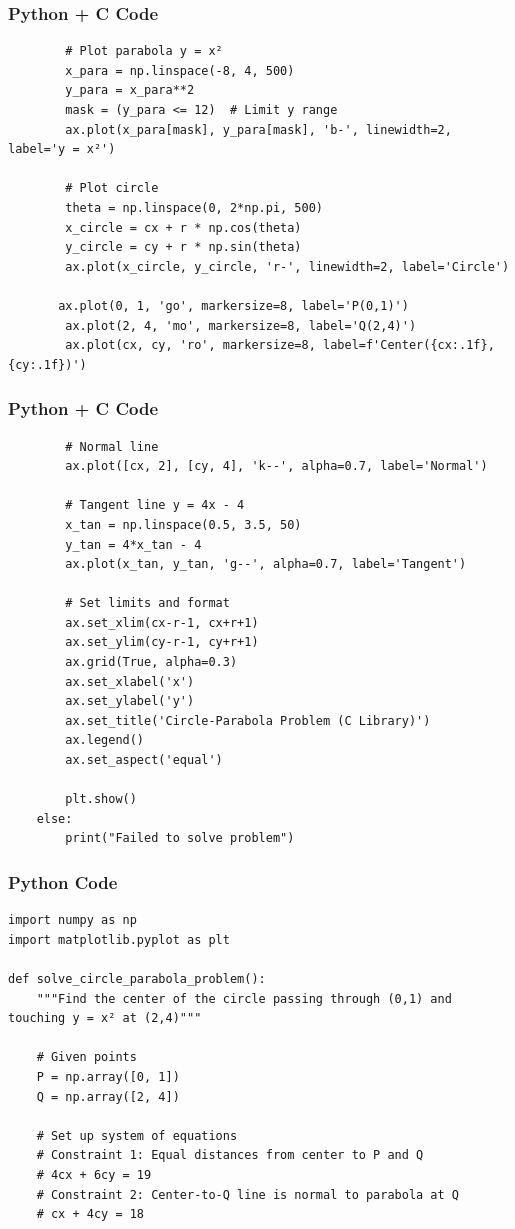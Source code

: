 \documentclass{beamer}
\numberwithin{equation}{section}
\begin{document}
\begin{frame}[fragile]
    \frametitle{Python + C Code }
    \begin{lstlisting}
        # Plot parabola y = x²
        x_para = np.linspace(-8, 4, 500)
        y_para = x_para**2
        mask = (y_para <= 12)  # Limit y range
        ax.plot(x_para[mask], y_para[mask], 'b-', linewidth=2, label='y = x²')
        
        # Plot circle
        theta = np.linspace(0, 2*np.pi, 500)
        x_circle = cx + r * np.cos(theta)
        y_circle = cy + r * np.sin(theta)
        ax.plot(x_circle, y_circle, 'r-', linewidth=2, label='Circle')
        
       ax.plot(0, 1, 'go', markersize=8, label='P(0,1)')
        ax.plot(2, 4, 'mo', markersize=8, label='Q(2,4)')
        ax.plot(cx, cy, 'ro', markersize=8, label=f'Center({cx:.1f},{cy:.1f})') 

\end{lstlisting}
\end{frame}
\begin{frame}[fragile]
    \frametitle{Python + C Code }
    \begin{lstlisting}
        # Normal line
        ax.plot([cx, 2], [cy, 4], 'k--', alpha=0.7, label='Normal')
        
        # Tangent line y = 4x - 4
        x_tan = np.linspace(0.5, 3.5, 50)
        y_tan = 4*x_tan - 4
        ax.plot(x_tan, y_tan, 'g--', alpha=0.7, label='Tangent')
        
        # Set limits and format
        ax.set_xlim(cx-r-1, cx+r+1)
        ax.set_ylim(cy-r-1, cy+r+1)
        ax.grid(True, alpha=0.3)
        ax.set_xlabel('x')
        ax.set_ylabel('y')
        ax.set_title('Circle-Parabola Problem (C Library)')
        ax.legend()
        ax.set_aspect('equal')
        
        plt.show()
    else:
        print("Failed to solve problem")

\end{lstlisting}
\end{frame}
\begin{frame}[fragile]
    \frametitle{Python Code }
    \begin{lstlisting}
import numpy as np
import matplotlib.pyplot as plt

def solve_circle_parabola_problem():
    """Find the center of the circle passing through (0,1) and touching y = x² at (2,4)"""
    
    # Given points
    P = np.array([0, 1])
    Q = np.array([2, 4])
    
    # Set up system of equations
    # Constraint 1: Equal distances from center to P and Q
    # 4cx + 6cy = 19
    # Constraint 2: Center-to-Q line is normal to parabola at Q  
    # cx + 4cy = 18

\end{lstlisting}
\end{frame}
\end{document}
